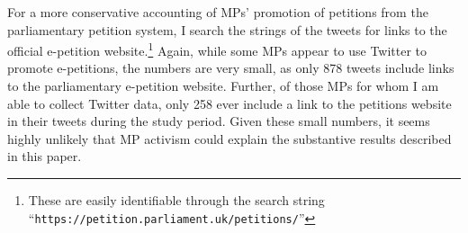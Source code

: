 \documentclass[12pt]{article}
\begin{document}
For a more conservative accounting of MPs' promotion of petitions from the parliamentary petition system, I search the strings of the tweets for links to the official e-petition website.\footnote{These are easily identifiable through the search string ``\texttt{https://petition.parliament.uk/petitions/}''} Again, while some MPs appear to use Twitter to promote e-petitions, the numbers are very small, as only 878 tweets include links to the parliamentary e-petition website. Further, of those MPs for whom I am able to collect Twitter data, only 258 ever include a link to the petitions website in their tweets during the study period. Given these small numbers, it seems highly unlikely that MP activism could explain the substantive results described in this paper.




\clearpage


\begin{table}
\begin{center}




\end{center}

\caption{\label{tab:part_results_full} \textbf{Second-level predictors (debate participation)} \\ Table presents median estimates and associated 95\% posterior intervals for the second-level logit coefficients described in equations \ref{eq:gamma_priors} and \ref{eq:alpha_priors} for the debate participation analysis. Model 1 is a baseline model, models 2 and 3 introduce MP and debate random-effects respectively, and model 4 includes both sets of random effects. Model 5 includes the  matrix of MP-topic random-effects ($\beta_{ik}$). }
\end{table}


\begin{table}
\begin{center}


\end{center}

\caption{\label{tab:approval_results_full} \textbf{Second-level predictors (petition approval)} \\ Table presents median estimates and associated 95\% posterior intervals for the second-level logit coefficients described in equations \ref{eq:gamma_priors} and \ref{eq:alpha_priors} for the petition approval analysis. Model 1 is a baseline model, models 2 and 3 introduce MP and debate random-effects respectively, and model 4 includes both sets of random effects. }
\end{table}
\end{document}
